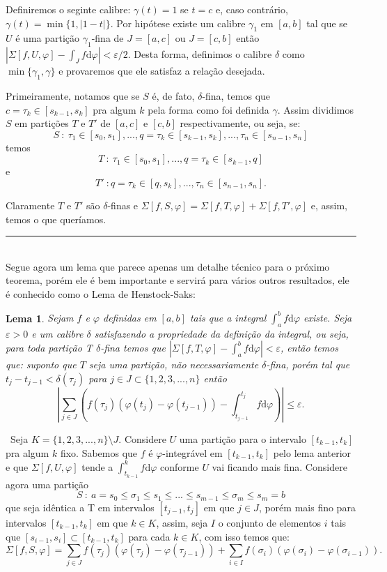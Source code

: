 \documentclass[12pt, a4paper]{article}
\newtheorem{lem}[mydef]{Lema}
\def\dem{\par\smallbreak\noindent {\textit{ Demonstração:}} \ }
\def\eop{\hfill\rule{2.5mm}{2.5mm}}
\theoremstyle{definition}
\begin{document}
Definiremos o seginte calibre: $\gamma(t)=1$ se $t=c$ e, caso contrário, $\gamma(t)=\min\{1,|1-t|\}$. Por hipótese existe um calibre $\gamma_1$ em $[a,b]$ tal que se $U$ é uma partição $\gamma_1$-fina de $J=[a,c]$ ou $J=[c,b]$ então $|\Sigma[f,U,\varphi]-\int_J f  \text{d}\varphi|<\varepsilon/2$. Desta forma, definimos o calibre $\delta$ como $\min\{\gamma_1,\gamma\}$ e provaremos que ele satisfaz a relação desejada. 

Primeiramente, notamos que se $S$ é, de fato, $\delta$-fina, temos que $c=\tau_k\in [s_{k-1},s_k]$ pra algum $k$ pela forma como foi definida $\gamma$. Assim dividimos $S$ em partições $T$ e $T'$ de $[a,c]$ e $[c,b]$ respectivamente, ou seja, se: $$S \ : \ \tau_1 \in [s_0,s_1],...,q=\tau_k \in [s_{k-1},s_k],...,\tau_n\in [s_{n-1},s_n]$$ temos $$T \ : \ \tau_1 \in [s_0,s_1],...,q=\tau_k \in [s_{k-1},q]$$ e $$T' \  : q=\tau_k \in [q,s_k],...,\tau_n \in [s_{n-1},s_n].$$ 

Claramente $T$ e $T'$ são $\delta$-finas e $\Sigma[f,S,\varphi]=\Sigma[f,T,\varphi]+\Sigma[f,T',\varphi]$ e, assim, temos o que queríamos. \eop \\

Segue agora um lema que parece apenas um detalhe técnico para o próximo teorema, porém ele é bem importante e servirá para vários outros resultados, ele é conhecido como o Lema de Henstock-Saks: 


\begin{lem}
	
	Sejam $f$ e $\varphi$ definidas em $[a,b]$ tais que a integral $\int_a^b f  \text{d}\varphi$ existe. Seja $\varepsilon>0$ e um calibre $\delta$ satisfazendo a propriedade da definição da integral, ou seja, para toda partição T $\delta$-fina temos que $|\Sigma[f,T,\varphi]-\int_a^b f  \text{d}\varphi|<\varepsilon$, então temos que: suponto que $T$ seja uma partição, não necessariamente $\delta$-fina, porém tal que $t_j-t_{j-1}<\delta(\tau_j)$ para $j\in J\subset \{ 1,2,3,...,n \}$ então $$\left| \sum_{j\in J} \left( f(\tau_j)(\varphi(t_j)-\varphi(t_{j-1}))- \int_{t_{j-1}}^{t_j} f  \text{d}\varphi\right)  \right| \leq \varepsilon. $$
	
\end{lem}

\dem Seja $K=\{1,2,3,...,n\}\setminus J$. Considere $U$ uma partição para o intervalo $[t_{k-1},t_k]$ pra algum $k$ fixo. Sabemos que $f$ é $\varphi$-integrável em $[t_{k-1},t_k]$ pelo lema anterior e que $\Sigma[f,U,\varphi]$ tende a $\int_{t_{k-1}}^kf  \text{d}\varphi$ conforme $U$ vai ficando mais fina. Considere agora uma partição $$S \ : \ a=s_0 \leq \sigma_1 \leq s_1 \leq ... \leq s_{m-1} \leq \sigma_m \leq s_m =b$$ que seja idêntica a T em intervalos $[t_{j-1},t_j]$ em que $j\in J$, porém mais fino para intervalos $[t_{k-1},t_k]$ em que $k\in K$, assim, seja $I$ o conjunto de elementos $i$ tais que $[s_{i-1},s_i]\subset [t_{k-1},t_k]$ para cada $k\in K$, com isso temos que: $$\Sigma[f,S,\varphi]= \sum_{j\in J}f(\tau_j)(\varphi(\tau_j)-\varphi(\tau_{j-1}))+\sum_{i\in I}f(\sigma_i)(\varphi(\sigma_i)-\varphi(\sigma_{i-1})).$$   
\end{document}
